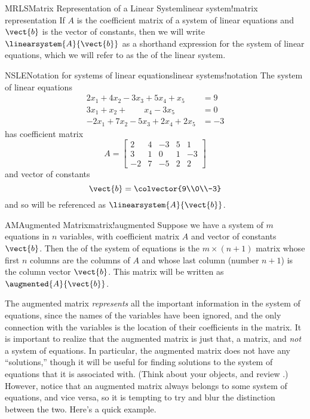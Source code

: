 %
\begin{definition}{MRLS}{Matrix Representation of a Linear System}{linear system!matrix representation}
If $A$ is the coefficient matrix of a system of linear equations and $\vect{b}$ is the vector of constants, then we will write $\linearsystem{A}{\vect{b}}$ as a shorthand expression for the  system of linear equations, which we will refer to as the  of the linear system.
\end{definition}
%
\begin{example}{NSLE}{Notation for systems of linear equations}{linear systems!notation}
The system of linear equations
%
\begin{align*}
2x_1+4x_2-3x_3+5x_4+x_5&=9\\
3x_1+x_2+\quad\quad x_4-3x_5&=0\\
-2x_1+7x_2-5x_3+2x_4+2x_5&=-3
\end{align*}
%
has coefficient matrix
%
\begin{equation*}
A=
\begin{bmatrix}
2 & 4 & -3 & 5 & 1\\
3 & 1 & 0 & 1 & -3\\
-2 & 7 & -5 & 2 & 2
\end{bmatrix}
\end{equation*}
%
and vector of constants
%
\begin{equation*}
\vect{b}=\colvector{9\\0\\-3}
\end{equation*}
%
and so will be referenced as $\linearsystem{A}{\vect{b}}$.
%
\end{example}
%
\begin{definition}{AM}{Augmented Matrix}{matrix!augmented}
Suppose we have a system of $m$ equations in $n$ variables, with coefficient matrix $A$ and vector of constants $\vect{b}$.  Then the  of the system of equations is the $m\times(n+1)$ matrix whose first $n$ columns are the columns of $A$ and whose last column (number $n+1$) is the column vector $\vect{b}$.  This matrix will be written as $\augmented{A}{\vect{b}}$.
\end{definition}
%
The augmented matrix {\em represents} all the important information in the system of equations, since the names of the variables have been ignored, and the only connection with the variables is the location of their coefficients in the matrix.  It is important to realize that the augmented matrix is just that, a matrix, and {\em not} a system of equations.  In particular, the augmented matrix does not have any ``solutions,'' though it will be useful for finding solutions to the system of equations that it is associated with.  (Think about your objects, and review .)  However, notice that an augmented matrix always belongs to some system of equations, and vice versa, so it is tempting to try and blur the distinction between the two.  Here's a quick example.
